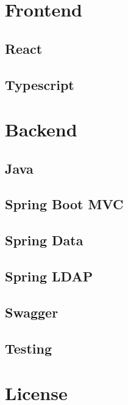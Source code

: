 \section{Frontend}
\subsection{React}
\subsection{Typescript}

\section{Backend}
\subsection{Java}
\subsection{Spring Boot MVC}
\subsection{Spring Data}
\subsection{Spring LDAP}
\subsection{Swagger}
\subsection{Testing}

\section{License}
